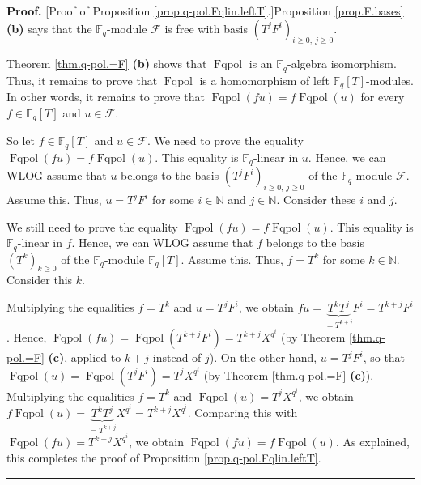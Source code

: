 \documentclass[numbers=enddot,12pt,final,onecolumn,notitlepage]{scrartcl}%
\theoremstyle{definition}
\newenvironment{proof}[1][Proof]{\noindent\textbf{#1.} }{\ \rule{0.5em}{0.5em}}
\begin{document}
\begin{proof}
[Proof of Proposition \ref{prop.q-pol.Fqlin.leftT}.]Proposition
\ref{prop.F.bases} \textbf{(b)} says that the $\mathbb{F}_{q}$-module
$\mathcal{F}$ is free with basis $\left(  T^{j}F^{i}\right)  _{i\geq
0,\ j\geq0}$.

Theorem \ref{thm.q-pol.=F} \textbf{(b)} shows that $\operatorname*{Fqpol}$ is
an $\mathbb{F}_{q}$-algebra isomorphism. Thus, it remains to prove that
$\operatorname*{Fqpol}$ is a homomorphism of left $\mathbb{F}_{q}\left[
T\right]  $-modules. In other words, it remains to prove that
$\operatorname*{Fqpol}\left(  fu\right)  =f\operatorname*{Fqpol}\left(
u\right)  $ for every $f\in\mathbb{F}_{q}\left[  T\right]  $ and
$u\in\mathcal{F}$.

So let $f\in\mathbb{F}_{q}\left[  T\right]  $ and $u\in\mathcal{F}$. We need
to prove the equality $\operatorname*{Fqpol}\left(  fu\right)
=f\operatorname*{Fqpol}\left(  u\right)  $. This equality is $\mathbb{F}_{q}%
$-linear in $u$. Hence, we can WLOG assume that $u$ belongs to the basis
$\left(  T^{j}F^{i}\right)  _{i\geq0,\ j\geq0}$ of the $\mathbb{F}_{q}$-module
$\mathcal{F}$. Assume this. Thus, $u=T^{j}F^{i}$ for some $i\in\mathbb{N}$ and
$j\in\mathbb{N}$. Consider these $i$ and $j$.

We still need to prove the equality $\operatorname*{Fqpol}\left(  fu\right)
=f\operatorname*{Fqpol}\left(  u\right)  $. This equality is $\mathbb{F}_{q}%
$-linear in $f$. Hence, we can WLOG assume that $f$ belongs to the basis
$\left(  T^{k}\right)  _{k\geq0}$ of the $\mathbb{F}_{q}$-module
$\mathbb{F}_{q}\left[  T\right]  $. Assume this. Thus, $f=T^{k}$ for some
$k\in\mathbb{N}$. Consider this $k$.

Multiplying the equalities $f=T^{k}$ and $u=T^{j}F^{i}$, we obtain
$fu=\underbrace{T^{k}T^{j}}_{=T^{k+j}}F^{i}=T^{k+j}F^{i}$. Hence,
$\operatorname*{Fqpol}\left(  fu\right)  =\operatorname*{Fqpol}\left(
T^{k+j}F^{i}\right)  =T^{k+j}X^{q^{i}}$ (by Theorem \ref{thm.q-pol.=F}
\textbf{(c)}, applied to $k+j$ instead of $j$). On the other hand,
$u=T^{j}F^{i}$, so that $\operatorname*{Fqpol}\left(  u\right)
=\operatorname*{Fqpol}\left(  T^{j}F^{i}\right)  =T^{j}X^{q^{i}}$ (by Theorem
\ref{thm.q-pol.=F} \textbf{(c)}). Multiplying the equalities $f=T^{k}$ and
$\operatorname*{Fqpol}\left(  u\right)  =T^{j}X^{q^{i}}$, we obtain
$f\operatorname*{Fqpol}\left(  u\right)  =\underbrace{T^{k}T^{j}}_{=T^{k+j}%
}X^{q^{i}}=T^{k+j}X^{q^{i}}$. Comparing this with $\operatorname*{Fqpol}%
\left(  fu\right)  =T^{k+j}X^{q^{i}}$, we obtain $\operatorname*{Fqpol}\left(
fu\right)  =f\operatorname*{Fqpol}\left(  u\right)  $. As explained, this
completes the proof of Proposition \ref{prop.q-pol.Fqlin.leftT}.
\end{proof}
\end{document}
